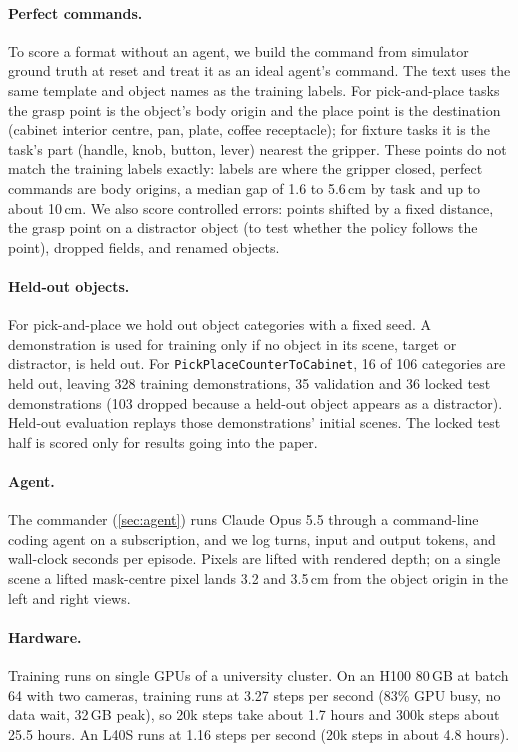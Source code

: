 \paragraph{Perfect commands.} To score a format without an agent, we build
the command from simulator ground truth at reset and treat it as an ideal
agent's command. The text uses the same template and object names as the
training labels. For pick-and-place tasks the grasp point is the object's
body origin and the place point is the destination (cabinet interior centre,
pan, plate, coffee receptacle); for fixture tasks it is the task's part
(handle, knob, button, lever) nearest the gripper. These points do not match
the training labels exactly: labels are where the gripper closed, perfect
commands are body origins, a median gap of 1.6 to 5.6\,cm by task and up to
about 10\,cm.  We also score controlled errors:
points shifted by a fixed distance, the grasp point on a distractor object (to
test whether the policy follows the point), dropped fields, and renamed
objects.

\paragraph{Held-out objects.} For pick-and-place we hold out object
categories with a fixed seed. A demonstration is used for training only if no
object in its scene, target or distractor, is held out. For
\texttt{PickPlaceCounterToCabinet}, 16 of 106 categories are held out,
leaving 328 training demonstrations, 35 validation and 36 locked test
demonstrations (103 dropped because a held-out object appears as a
distractor). Held-out evaluation replays those demonstrations' initial
scenes. The locked test half is scored only for results going into the
paper. 

\paragraph{Agent.} The commander (\cref{sec:agent}) runs Claude Opus 5.5
through a command-line coding agent on a subscription, and we log turns,
input and output tokens, and wall-clock seconds per episode. Pixels are
lifted with rendered depth; on a single scene a lifted mask-centre pixel lands
3.2 and 3.5\,cm from the object origin in the left and right views.

\paragraph{Hardware.} Training runs on single GPUs of a university cluster.
On an H100 80\,GB at batch 64 with two cameras, training runs at 3.27 steps
per second (83\% GPU busy, no data wait, 32\,GB peak), so 20k steps take
about 1.7 hours and 300k steps about 25.5 hours. An L40S runs at 1.16 steps
per second (20k steps in about 4.8 hours).

